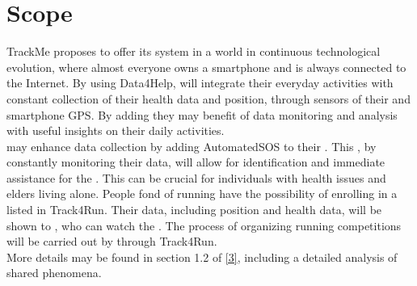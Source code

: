 \documentclass[../../DD.tex]{subfiles}
\begin{document}
\section{Scope}
	TrackMe proposes to offer its system in a world in continuous technological evolution, where almost everyone owns a smartphone and is always connected to the Internet.
	By using Data4Help,  will integrate their everyday activities with constant collection of their health data and position, through sensors of their  and smartphone GPS. By adding  they may benefit of data monitoring and analysis with useful insights on their daily activities. \\

	 may enhance data collection by adding AutomatedSOS to their . This , by constantly monitoring their data, will allow for identification and immediate assistance for the . This can be crucial for individuals with health issues and elders living alone.
	People fond of running have the possibility of enrolling in a  listed in Track4Run. Their data, including position and health data, will be shown to , who can watch the . The process of organizing running competitions will be carried out by  through Track4Run.\\

	More details may be found in section 1.2 of  \hyperref[ref:3]{[3]}, including a detailed analysis of shared phenomena.
\end{document}
